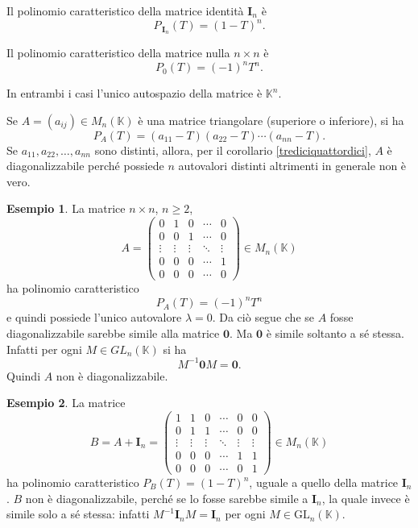 \documentclass{article}
\theoremstyle{plain}
\theoremstyle{definition}
\newtheorem{exmp}{Esempio}[section]
\theoremstyle{remark}
\begin{document}
\vspace{10pt}

Il polinomio caratteristico della matrice identità $\mathbf{I}_n$ è
\[P_{\,\mathbf{I}_n}(T) = (1 - T)^n.\]

\vspace{10pt}

Il polinomio caratteristico della matrice nulla $n \times n$ è
\[P_{\mathit{0}}(T) = (-1)^n T^n.\]

\vspace{10pt}

In entrambi i casi l'unico autospazio della matrice è $\mathbb{K}^n$.

\vspace{10pt}

Se $A = (a_{ij}) \in M_n(\mathbb{K})$ è una matrice triangolare (superiore o inferiore), si ha
\[P_A(T) = (a_{11} - T)(a_{22} - T) \cdots (a_{nn} - T).\]
Se $a_{11}, a_{22}, \ldots, a_{nn}$ sono distinti, allora, per il corollario \ref{trediciquattordici}, $A$ 
è diagonalizzabile perché possiede $n$ autovalori distinti altrimenti in generale non è vero.    

\vspace{10pt}

\begin{exmp}\label{ex:tre}
La matrice $n \times n$, $n \geq 2$,
\[
A = \begin{pmatrix}
0 & 1 & 0 & \cdots & 0 \\
0 & 0 & 1 & \cdots & 0 \\
\vdots & \vdots & \vdots & \ddots & \vdots \\
0 & 0 & 0 & \cdots & 1 \\
0 & 0 & 0 & \cdots & 0
\end{pmatrix} \in M_n(\mathbb{K})
\]
ha polinomio caratteristico
\[
P_A(T) = (-1)^n T^n
\]
e quindi possiede l'unico autovalore $\lambda = 0$. Da ciò segue che se $A$ fosse diagonalizzabile sarebbe simile alla matrice $\mathbf{0}$. Ma $\mathbf{0}$ è simile soltanto a sé stessa. Infatti per ogni $M \in GL_n(\mathbb{K})$ si ha
\[
M^{-1}\mathbf{0}M = \mathbf{0}.
\]
Quindi $A$ non è diagonalizzabile.    
\end{exmp}

\vspace{10pt}

\begin{exmp}
La matrice
\[
B = A + \mathbf{I}_n = \begin{pmatrix}
1 & 1 & 0 & \cdots & 0 & 0 \\
0 & 1 & 1 & \cdots & 0 & 0 \\
\vdots & \vdots & \vdots & \ddots & \vdots & \vdots \\
0 & 0 & 0 & \cdots & 1 & 1 \\
0 & 0 & 0 & \cdots & 0 & 1
\end{pmatrix} \in M_n(\mathbb{K})
\]
ha polinomio caratteristico $P_B(T) = (1 - T)^n$, uguale a quello della matrice $\mathbf{I}_n$. 
$B$ non è diagonalizzabile, perché se lo fosse sarebbe simile a $\mathbf{I}_n$, la quale invece è simile solo a sé 
stessa: infatti $M^{-1}\mathbf{I}_nM = \mathbf{I}_n$ per ogni $M \in \mathrm{GL}_n(\mathbb{K})$.    
\end{exmp}
\end{document}
